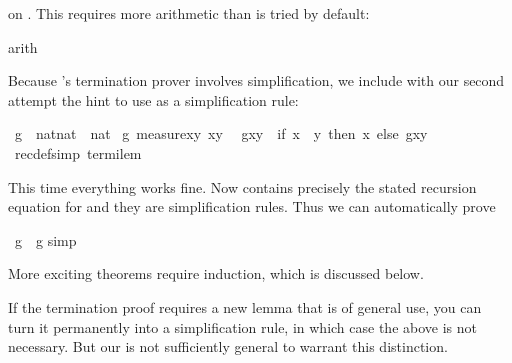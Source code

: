 \begin{isabellebody}
\begin{isamarkuptxt}
on . This requires more arithmetic than is tried by default:%
\end{isamarkuptxt}%
arith{\isacharparenright}\isanewline
{}%
\begin{isamarkuptext}%
\noindent
Because 's termination prover involves simplification,
we include with our second attempt the hint to use  as
a simplification rule:%
\end{isamarkuptext}%
\ g\ {\isacharcolon}{\isacharcolon}\ {\isachardoublequote}nat{\isasymtimes}nat\ {\isasymRightarrow}\ nat{\isachardoublequote}\isanewline
{}\ g\ {\isachardoublequote}measure{\isacharparenleft}{\isasymlambda}{\isacharparenleft}x{\isacharcomma}y{\isacharparenright}{\isachardot}\ x{\isacharminus}y{\isacharparenright}{\isachardoublequote}\isanewline
\ \ {\isachardoublequote}g{\isacharparenleft}x{\isacharcomma}y{\isacharparenright}\ {\isacharequal}\ {\isacharparenleft}if\ x\ {\isasymle}\ y\ then\ x\ else\ g{\isacharparenleft}x{\isacharcomma}y{\isacharplus}\isanewline
{\isacharparenleft}\ recdef{\isacharunderscore}simp{\isacharcolon}\ termi{\isacharunderscore}lem{\isacharparenright}%
\begin{isamarkuptext}%
\noindent
This time everything works fine. Now  contains precisely
the stated recursion equation for  and they are simplification
rules. Thus we can automatically prove%
\end{isamarkuptext}%
\ {\isachardoublequote}g{\isacharparenleft}\ {\isacharequal}\ g{\isacharparenleft}\isanewline
{}simp{\isacharparenright}\isanewline
{}%
\begin{isamarkuptext}%
\noindent
More exciting theorems require induction, which is discussed below.

If the termination proof requires a new lemma that is of general use, you can
turn it permanently into a simplification rule, in which case the above
 is not necessary. But our  is not
sufficiently general to warrant this distinction.


\end{isamarkuptext}
\end{isabellebody}
